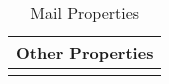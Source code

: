 \begin{longtable}{lp{}}
\multicolumn{2}{l}{Other Properties} \\*
\toprule
\endfirsthead
\endhead
\caption{Mail Properties}
\label{tbl:mail_properties}
\endlastfoot
\end{longtable}
